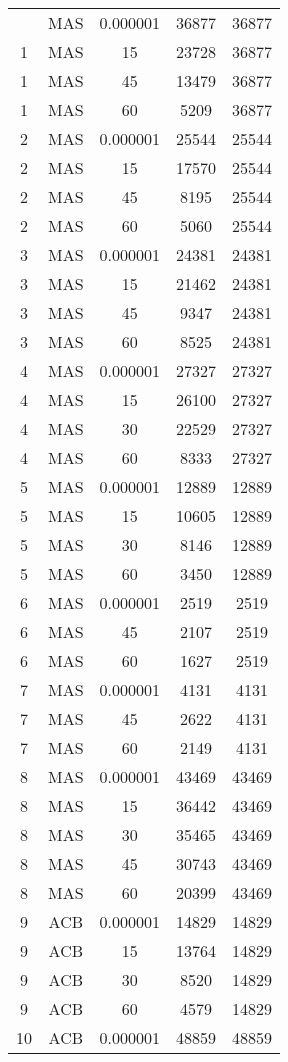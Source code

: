\begin{center}
\begin{longtable}{ccccc}
\hline \hline
\endlastfoot	
1	&	MAS	&	0.000001	&	36877	&	36877	\\
1	&	MAS	&	15	&	23728	&	36877	\\
1	&	MAS	&	45	&	13479	&	36877	\\
1	&	MAS	&	60	&	5209	&	36877	\\
2	&	MAS	&	0.000001	&	25544	&	25544	\\
2	&	MAS	&	15	&	17570	&	25544	\\
2	&	MAS	&	45	&	8195	&	25544	\\
2	&	MAS	&	60	&	5060	&	25544	\\
3	&	MAS	&	0.000001	&	24381	&	24381	\\
3	&	MAS	&	15	&	21462	&	24381	\\
3	&	MAS	&	45	&	9347	&	24381	\\
3	&	MAS	&	60	&	8525	&	24381	\\
4	&	MAS	&	0.000001	&	27327	&	27327	\\
4	&	MAS	&	15	&	26100	&	27327	\\
4	&	MAS	&	30	&	22529	&	27327	\\
4	&	MAS	&	60	&	8333	&	27327	\\
5	&	MAS	&	0.000001	&	12889	&	12889	\\
5	&	MAS	&	15	&	10605	&	12889	\\
5	&	MAS	&	30	&	8146	&	12889	\\
5	&	MAS	&	60	&	3450	&	12889	\\
6	&	MAS	&	0.000001	&	2519	&	2519	\\
6	&	MAS	&	45	&	2107	&	2519	\\
6	&	MAS	&	60	&	1627	&	2519	\\
7	&	MAS	&	0.000001	&	4131	&	4131	\\
7	&	MAS	&	45	&	2622	&	4131	\\
7	&	MAS	&	60	&	2149	&	4131	\\
8	&	MAS	&	0.000001	&	43469	&	43469	\\
8	&	MAS	&	15	&	36442	&	43469	\\
8	&	MAS	&	30	&	35465	&	43469	\\
8	&	MAS	&	45	&	30743	&	43469	\\
8	&	MAS	&	60	&	20399	&	43469	\\
9	&	ACB	&	0.000001	&	14829	&	14829	\\
9	&	ACB	&	15	&	13764	&	14829	\\
9	&	ACB	&	30	&	8520	&	14829	\\
9	&	ACB	&	60	&	4579	&	14829	\\
10	&	ACB	&	0.000001	&	48859	&	48859	\\

\end{longtable}
\end{center}
